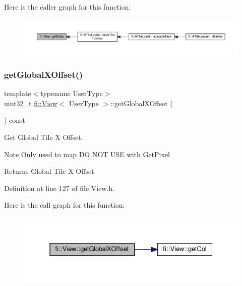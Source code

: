 Here is the caller graph for this function\+:
\nopagebreak
\begin{figure}[H]
\begin{center}
\leavevmode
\includegraphics[width=350pt]{d5/dd4/classfi_1_1View_a8fd719fcea9c7a98cfd0feba96fe5afe_icgraph}
\end{center}
\end{figure}
\mbox{\label{classfi_1_1View_ae904f2103857876c460a3d9cb09c463b}} 
\subsubsection{\texorpdfstring{get\+Global\+X\+Offset()}{getGlobalXOffset()}}
{\footnotesize\ttfamily template$<$typename User\+Type$>$ \\
uint32\+\_\+t \hyperlink{classfi_1_1View}{fi\+::\+View}$<$ User\+Type $>$\+::get\+Global\+X\+Offset (\begin{DoxyParamCaption}{ }\end{DoxyParamCaption}) const\hspace{0.3cm}{\ttfamily [inline]}}



Get Global Tile X Offset. 

\begin{DoxyNote}{Note}
Only used to map DO N\+OT U\+SE with Get\+Pixel 
\end{DoxyNote}
\begin{DoxyReturn}{Returns}
Global Tile X Offset 
\end{DoxyReturn}


Definition at line 127 of file View.\+h.

Here is the call graph for this function\+:
\nopagebreak
\begin{figure}[H]
\begin{center}
\leavevmode
\includegraphics[width=331pt]{d5/dd4/classfi_1_1View_ae904f2103857876c460a3d9cb09c463b_cgraph}
\end{center}
\end{figure}
\mbox{\label{classfi_1_1View_a6cb46dcea151973eb4ebc0160586b16e}} 

